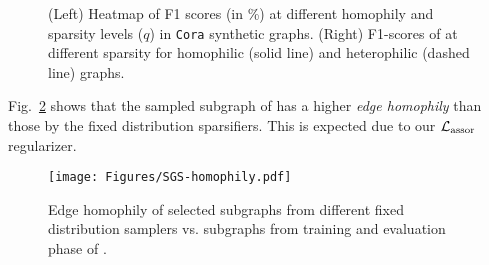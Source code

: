 \begin{figure}[!htbp]
    \centering
    \hfill
    \caption{(Left) Heatmap of F1 scores (in \%) at different homophily and sparsity levels ($q$) in \texttt{Cora} synthetic graphs. (Right) F1-scores of \sgs at different sparsity for homophilic (solid line) and heterophilic (dashed line) graphs.}
    \label{fig:sparsevshomophily}
\end{figure}


Fig.~\ref{fig:edgehomophily} shows that the sampled subgraph of \sgs has a higher \emph{edge homophily} than those by the fixed distribution sparsifiers. This is expected due to our ${\mathcal{L}}_\mathrm{assor}$ regularizer.

\begin{figure}[!htbp]
    \centering
    \texttt{[image: Figures/SGS-homophily.pdf]}    
    \caption{Edge homophily of selected subgraphs from different fixed distribution samplers vs. subgraphs from training and evaluation phase of \sgs.}
    \label{fig:edgehomophily}
\end{figure}

